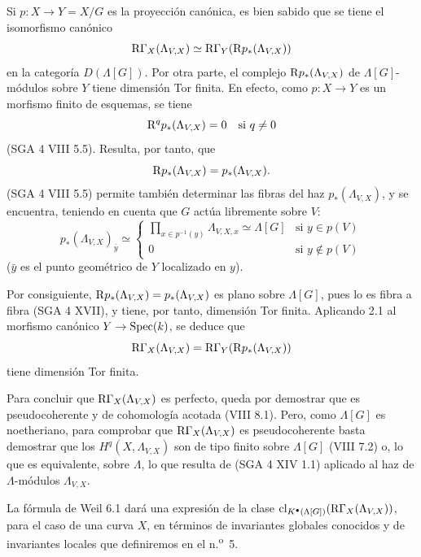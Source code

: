 \begin{prooftext}[Demostración]
Si $p:X\to Y=X/G$ es la proyección canónica, es bien sabido que se tiene el isomorfismo canónico
\[
\mathrm{R}\Gamma_X(\Lambda_{V,X})\simeq \mathrm{R}\Gamma_Y(\mathrm{R} p_*(\Lambda_{V,X}))
\]
en la categoría $D(\Lambda[G])$. Por otra parte, el complejo $\mathrm{R} p_*(\Lambda_{V,X})$ de $\Lambda[G]$-módulos sobre $Y$ tiene dimensión Tor finita. En efecto, como $p:X\to Y$ es un morfismo finito de esquemas, se tiene
\[
\mathrm{R}^q p_*(\Lambda_{V,X})=0\quad\text{si }q\ne0
\]
(SGA 4 VIII 5.5). Resulta, por tanto, que
\[
\mathrm{R} p_*(\Lambda_{V,X})=p_*(\Lambda_{V,X}).
\]
(SGA 4 VIII 5.5) permite también determinar las fibras del haz $p_*(\Lambda_{V,X})$, y se encuentra, teniendo en cuenta que $G$ actúa libremente sobre $V$:
\[
p_*(\Lambda_{V,X})_{\bar y}\simeq
\begin{cases}
\displaystyle \prod_{x\in p^{-1}(y)}\Lambda_{V,X,x}\simeq \Lambda[G]& \text{si } y\in p(V)\\[1em]
0& \text{si } y\notin p(V)
\end{cases}
\]
($\bar y$ es el punto geométrico de $Y$ localizado en $y$).

Por consiguiente, $\mathrm{R} p_*(\Lambda_{V,X})=p_*(\Lambda_{V,X})$ es plano sobre $\Lambda[G]$, pues lo es fibra a fibra (SGA 4 XVII), y tiene, por tanto, dimensión Tor finita. Aplicando 2.1 al morfismo canónico $Y\to\operatorname{Spec}(k)$, se deduce que
\[
\mathrm{R}\Gamma_X(\Lambda_{V,X})=\mathrm{R}\Gamma_Y(\mathrm{R} p_*(\Lambda_{V,X}))
\]
tiene dimensión Tor finita.

Para concluir que $\mathrm{R}\Gamma_X(\Lambda_{V,X})$ es perfecto, queda por demostrar que es pseudocoherente y de cohomología acotada (VIII 8.1). Pero, como $\Lambda[G]$ es noetheriano, para comprobar que $\mathrm{R}\Gamma_X(\Lambda_{V,X})$ es pseudocoherente basta demostrar que los $H^q(X,\Lambda_{V,X})$ son de tipo finito sobre $\Lambda[G]$ (VIII 7.2) o, lo que es equivalente, sobre $\Lambda$, lo que resulta de (SGA 4 XIV 1.1) aplicado al haz de $\Lambda$-módulos $\Lambda_{V,X}$.
\end{prooftext}

La fórmula de Weil 6.1 dará una expresión de la clase $\operatorname{cl}_{K^\bullet(\Lambda[G])}(\mathrm{R}\Gamma_X(\Lambda_{V,X}))$, para el caso de una curva $X$, en términos de invariantes globales conocidos y de invariantes locales que definiremos en el n.\textsuperscript{o}~5.
